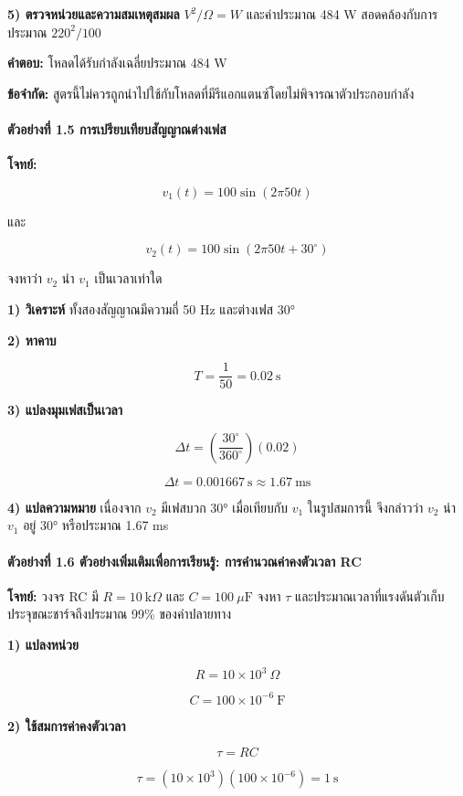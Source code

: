 \textbf{5) ตรวจหน่วยและความสมเหตุสมผล}
$V^2/\Omega=W$ และค่าประมาณ 484 W สอดคล้องกับการประมาณ $220^2/100$

\textbf{คำตอบ:} โหลดได้รับกำลังเฉลี่ยประมาณ 484 W

\textbf{ข้อจำกัด:} สูตรนี้ไม่ควรถูกนำไปใช้กับโหลดที่มีรีแอกแตนซ์โดยไม่พิจารณาตัวประกอบกำลัง

 

\paragraph{ตัวอย่างที่ 1.5 การเปรียบเทียบสัญญาณต่างเฟส}

\textbf{โจทย์:}

\[
v_1(t)=100\sin(2\pi50t)
\]

และ

\[
v_2(t)=100\sin(2\pi50t+30^\circ)
\]

จงหาว่า $v_2$ นำ $v_1$ เป็นเวลาเท่าใด

\textbf{1) วิเคราะห์}
ทั้งสองสัญญาณมีความถี่ 50 Hz และต่างเฟส 30°

\textbf{2) หาคาบ}

\[
T=\frac{1}{50}=0.02\ \mathrm{s}
\]

\textbf{3) แปลงมุมเฟสเป็นเวลา}

\[
\Delta t=\left(\frac{30^\circ}{360^\circ}\right)(0.02)
\]

\[
\Delta t=0.001667\ \mathrm{s}\approx1.67\ \mathrm{ms}
\]

\textbf{4) แปลความหมาย}
เนื่องจาก $v_2$ มีเฟสบวก 30° เมื่อเทียบกับ $v_1$ ในรูปสมการนี้ จึงกล่าวว่า $v_2$ นำ $v_1$ อยู่ 30° หรือประมาณ 1.67 ms

 

\paragraph{ตัวอย่างที่ 1.6 \textbf{ตัวอย่างเพิ่มเติมเพื่อการเรียนรู้:} การคำนวณค่าคงตัวเวลา RC}

\textbf{โจทย์:} วงจร RC มี $R=10\ \mathrm{k}\Omega$ และ $C=100\ \mu\mathrm{F}$ จงหา $\tau$ และประมาณเวลาที่แรงดันตัวเก็บประจุขณะชาร์จถึงประมาณ 99\% ของค่าปลายทาง

\textbf{1) แปลงหน่วย}

\[
R=10\times10^3\ \Omega
\]

\[
C=100\times10^{-6}\ \mathrm{F}
\]

\textbf{2) ใช้สมการค่าคงตัวเวลา}

\[
\tau=RC
\]

\[
\tau=(10\times10^3)(100\times10^{-6})=1\ \mathrm{s}
\]

